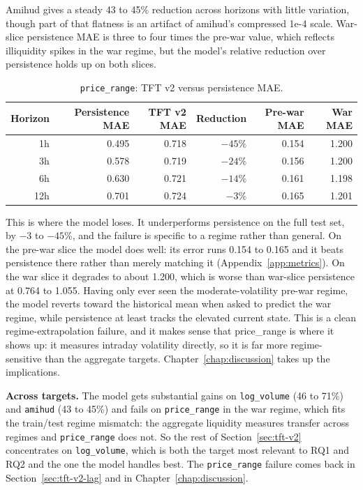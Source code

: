Amihud gives a steady 43 to 45\% reduction across horizons with little variation, though part of that flatness is an artifact of amihud's compressed 1e-4 scale. War-slice persistence MAE is three to four times the pre-war value, which reflects illiquidity spikes in the war regime, but the model's relative reduction over persistence holds up on both slices.

\begin{table}[h]
  \centering
  \caption{\texttt{price\_range}: TFT v2 versus persistence MAE.}
  \label{tab:mae-pricerange}
  \begin{tabular}{@{}rrrrrr@{}}
    \toprule
    Horizon & Persistence MAE & TFT v2 MAE & Reduction & Pre-war MAE & War MAE \\
    \midrule
    1h & 0.495 & 0.718 & $-45$\% & 0.154 & 1.200 \\
    3h & 0.578 & 0.719 & $-24$\% & 0.156 & 1.200 \\
    6h & 0.630 & 0.721 & $-14$\% & 0.161 & 1.198 \\
    12h & 0.701 & 0.724 & $-3$\% & 0.165 & 1.201 \\
    \bottomrule
  \end{tabular}
\end{table}

This is where the model loses. It underperforms persistence on the full test set, by $-3$ to $-45$\%, and the failure is specific to a regime rather than general. On the pre-war slice the model does well: its error runs 0.154 to 0.165 and it beats persistence there rather than merely matching it (Appendix~\ref{app:metrics}). On the war slice it degrades to about 1.200, which is worse than war-slice persistence at 0.764 to 1.055. Having only ever seen the moderate-volatility pre-war regime, the model reverts toward the historical mean when asked to predict the war regime, while persistence at least tracks the elevated current state. This is a clean regime-extrapolation failure, and it makes sense that price\_range is where it shows up: it measures intraday volatility directly, so it is far more regime-sensitive than the aggregate targets. Chapter~\ref{chap:discussion} takes up the implications.

\textbf{Across targets.} The model gets substantial gains on \texttt{log\_volume} (46 to 71\%) and \texttt{amihud} (43 to 45\%) and fails on \texttt{price\_range} in the war regime, which fits the train/test regime mismatch: the aggregate liquidity measures transfer across regimes and \texttt{price\_range} does not. So the rest of Section~\ref{sec:tft-v2} concentrates on \texttt{log\_volume}, which is both the target most relevant to RQ1 and RQ2 and the one the model handles best. The \texttt{price\_range} failure comes back in Section~\ref{sec:tft-v2-lag} and in Chapter~\ref{chap:discussion}.

